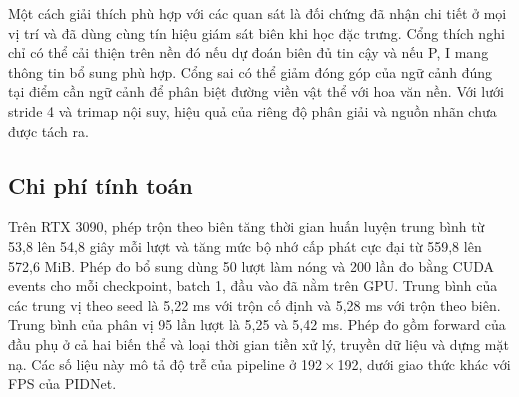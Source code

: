 Một cách giải thích phù hợp với các quan sát là đối chứng đã nhận chi tiết ở mọi vị trí và đã dùng cùng tín hiệu giám sát biên khi học đặc trưng. Cổng thích nghi chỉ có thể cải thiện trên nền đó nếu dự đoán biên đủ tin cậy và nếu P, I mang thông tin bổ sung phù hợp. Cổng sai có thể giảm đóng góp của ngữ cảnh đúng tại điểm cần ngữ cảnh để phân biệt đường viền vật thể với hoa văn nền. Với lưới stride 4 và trimap nội suy, hiệu quả của riêng độ phân giải và nguồn nhãn chưa được tách ra.

\subsection{Chi phí tính toán}

Trên RTX 3090, phép trộn theo biên tăng thời gian huấn luyện trung bình từ 53,8 lên 54,8 giây mỗi lượt và tăng mức bộ nhớ cấp phát cực đại từ 559,8 lên 572,6 MiB. Phép đo bổ sung dùng 50 lượt làm nóng và 200 lần đo bằng CUDA events cho mỗi checkpoint, batch 1, đầu vào đã nằm trên GPU. Trung bình của các trung vị theo seed là 5,22 ms với trộn cố định và 5,28 ms với trộn theo biên. Trung bình của phân vị 95 lần lượt là 5,25 và 5,42 ms. Phép đo gồm forward của đầu phụ ở cả hai biến thể và loại thời gian tiền xử lý, truyền dữ liệu và dựng mặt nạ. Các số liệu này mô tả độ trễ của pipeline ở 192\,$\times$\,192, dưới giao thức khác với FPS của PIDNet.
